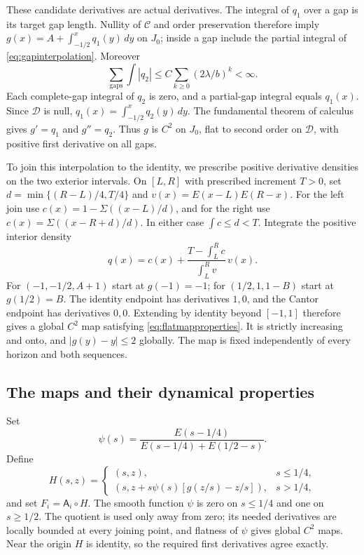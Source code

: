 \documentclass[11pt]{amsart}
\theoremstyle{definition}
\theoremstyle{remark}
\numberwithin{equation}{section}
\begin{document}
These candidate derivatives are actual derivatives. The integral of
$q_1$ over a gap is its target gap length. Nullity of $\mathcal C$
and order preservation therefore imply
$g(x)=A+\int_{-1/2}^xq_1(y)\,dy$ on $J_0$; inside a gap include
the partial integral of \eqref{eq:gapinterpolation}.
Moreover
\[
\sum_{\text{gaps}}\int|q_2|
                  \le C\sum_{k\ge0}(2\lambda/b)^k<\infty.
\]
Each complete-gap integral of $q_2$ is zero, and a partial-gap
integral equals $q_1(x)$. Since $\mathcal D$ is null,
$q_1(x)=\int_{-1/2}^xq_2(y)\,dy$. The fundamental theorem of
calculus gives $g'=q_1$ and $g''=q_2$. Thus $g$ is $C^2$
on $J_0$, flat to second order on $\mathcal D$, with positive
first derivative on all gaps.

To join this interpolation to the identity, we prescribe positive
derivative densities on the two exterior intervals. On $[L,R]$
with prescribed increment $T>0$, set
$d=\min\{(R-L)/4,T/4\}$ and $v(x)=E(x-L)E(R-x)$.
For the left join use $c(x)=1-\Sigma((x-L)/d)$, and for the right
use $c(x)=\Sigma((x-R+d)/d)$. In either case $\int c\le d<T$.
Integrate the positive interior density
\begin{equation}\label{eq:extensiondensity}
q(x)=c(x)+\frac{T-\int_L^R c}{\int_L^R v}\,v(x).
\end{equation}
For $(-1,-1/2,A+1)$ start at $g(-1)=-1$; for
$(1/2,1,1-B)$ start at $g(1/2)=B$.
The identity endpoint has derivatives $1,0$, and the Cantor endpoint
has derivatives $0,0$. Extending by identity beyond $[-1,1]$
therefore gives a global $C^2$ map satisfying
\eqref{eq:flatmapproperties}. It is strictly increasing and onto,
and $|g(y)-y|\le2$ globally. The map is fixed independently of
every horizon and both sequences.

\subsection{The maps and their dynamical properties}
Set
\[
\psi(s)=\frac{E(s-1/4)}{E(s-1/4)+E(1/2-s)}.
\]
Define
\[
H(s,z)=
\begin{cases}
(s,z),&s\le1/4,\\
(s,z+s\psi(s)[g(z/s)-z/s]),&s>1/4,
\end{cases}
\]
and set $F_i=\mathsf A_i\circ H$.
The smooth function $\psi$ is zero on $s\le1/4$ and one on
$s\ge1/2$. The quotient is used only away from zero; its needed
derivatives are locally bounded at every joining point, and flatness
of $\psi$ gives global $C^2$ maps. Near the origin $H$ is identity,
so the required first derivatives agree exactly.
\end{document}
